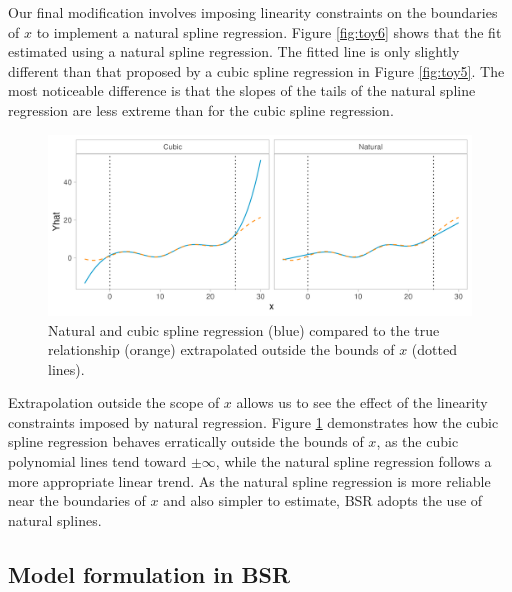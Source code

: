 \documentclass[12pt, twoside]{amherstthesis}
\begin{document}
Our final modification involves imposing linearity constraints on the boundaries of \(x\) to implement a natural spline regression. Figure \ref{fig:toy6} shows that the fit estimated using a natural spline regression. The fitted line is only slightly different than that proposed by a cubic spline regression in Figure \ref{fig:toy5}. The most noticeable difference is that the slopes of the tails of the natural spline regression are less extreme than for the cubic spline regression.
\begin{figure}

{\centering \includegraphics[width=1\linewidth]{figures/ch3_toybounds} 

}

\caption{Natural and cubic spline regression (blue) compared to the true relationship (orange) extrapolated outside the bounds of $x$ (dotted lines).}\label{fig:toybounds}
\end{figure}
Extrapolation outside the scope of \(x\) allows us to see the effect of the linearity constraints imposed by natural regression. Figure \ref{fig:toybounds} demonstrates how the cubic spline regression behaves erratically outside the bounds of \(x\), as the cubic polynomial lines tend toward \(\pm\infty\), while the natural spline regression follows a more appropriate linear trend. As the natural spline regression is more reliable near the boundaries of \(x\) and also simpler to estimate, BSR adopts the use of natural splines.

\hypertarget{model-formulation-in-bsr}{%
\subsection{Model formulation in BSR}\label{model-formulation-in-bsr}}
\end{document}
